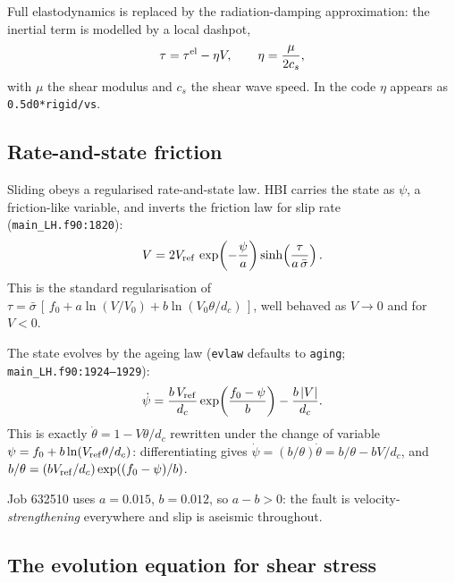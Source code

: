 \documentclass[11pt]{article}
\newcommand{\code}[1]{\texttt{#1}}
\newcommand{\sigeff}{\bar{\sigma}}
\begin{document}
Full elastodynamics is replaced by the radiation-damping approximation: the
inertial term is modelled by a local dashpot,
\begin{equation}
  \tau = \tau^{\rm el} - \eta V,
  \qquad
  \eta = \frac{\mu}{2 c_s},
  \label{eq:raddamp}
\end{equation}
with $\mu$ the shear modulus and $c_s$ the shear wave speed. In the code
$\eta$ appears as \code{0.5d0*rigid/vs}.

\subsection{Rate-and-state friction}

Sliding obeys a regularised rate-and-state law. HBI carries the state as
$\psi$, a friction-like variable, and inverts the friction law for slip rate
(\code{main\_LH.f90:1820}):
\begin{equation}
  V = 2 V_{\rm ref}\,
      \exp\!\left(-\frac{\psi}{a}\right)
      \sinh\!\left(\frac{\tau}{a\,\sigeff}\right).
  \label{eq:vel}
\end{equation}
This is the standard regularisation of $\tau = \sigeff\,[\,f_0 + a\ln(V/V_0) +
b\ln(V_0\theta/d_c)\,]$, well behaved as $V\to0$ and for $V<0$.

The state evolves by the ageing law (\code{evlaw} defaults to \code{aging};
\code{main\_LH.f90:1924--1929}):
\begin{equation}
  \dot\psi = \frac{b\,V_{\rm ref}}{d_c}\exp\!\left(\frac{f_0-\psi}{b}\right)
             - \frac{b\,|V|}{d_c}.
  \label{eq:aging}
\end{equation}
This is exactly $\dot\theta = 1 - V\theta/d_c$ rewritten under the change of
variable $\psi = f_0 + b\ln(V_{\rm ref}\theta/d_c)$: differentiating gives
$\dot\psi = (b/\theta)\dot\theta = b/\theta - bV/d_c$, and
$b/\theta = (bV_{\rm ref}/d_c)\exp((f_0-\psi)/b)$.

Job 632510 uses $a=0.015$, $b=0.012$, so $a-b>0$: the fault is
velocity-\emph{strengthening} everywhere and slip is aseismic throughout.

\subsection{The evolution equation for shear stress}
\end{document}
